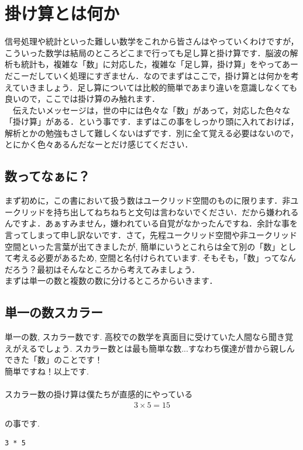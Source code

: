 \documentclass[11pt,a4paper,uplatex]{ujreport}
\begin{document}
\section{掛け算とは何か}
信号処理や統計といった難しい数学をこれから皆さんはやっていくわけですが，こういった数学は結局のところどこまで行っても足し算と掛け算です．脳波の解析も統計も，複雑な「数」に対応した，複雑な「足し算，掛け算」をやってあーだこーだしていく処理にすぎません．なのでまずはここで，掛け算とは何かを考えていきましょう．足し算については比較的簡単であまり違いを意識しなくても良いので，ここでは掛け算のみ触れます．\\
　伝えたいメッセージは，世の中には色々な「数」があって，対応した色々な「掛け算」がある．という事です．まずはこの事をしっかり頭に入れておけば，解析とかの勉強もさして難しくないはずです．別に全て覚える必要はないので，とにかく色々あるんだなーとだけ感じてください．
\subsection{数ってなぁに？}
まず初めに，この書において扱う数はユークリッド空間のものに限ります．非ユークリッドを持ち出してねちねちと文句は言わないでください．だから嫌われるんですよ．あぁすみません，嫌われている自覚がなかったんですね．余計な事を言ってしまって申し訳ないです．さて，先程ユークリッド空間や非ユークリッド空間といった言葉が出てきましたが, 簡単にいうとこれらは全て別の「数」として考える必要があるため, 空間と名付けられています. そもそも，「数」ってなんだろう？最初はそんなところから考えてみましょう．\\
まずは単一の数と複数の数に分けるところからいきます．\\

\subsection{単一の数スカラー}
単一の数, スカラー数です. 高校での数学を真面目に受けていた人間なら聞き覚えがえるでしょう. スカラー数とは最も簡単な数...すなわち僕達が昔から親しんできた「数」のことです！\\
簡単ですね！以上です.\\
\\
スカラー数の掛け算は僕たちが直感的にやっている
\begin{eqnarray}
\label{eq:kakezan}
3 \times 5 = 15
\end{eqnarray}

の事です.
\begin{lstlisting}[caption=式(\ref{eq:kakezan})のMATLABコード,label=sc:kakezan]
3 * 5
\end{lstlisting}
\end{document}
